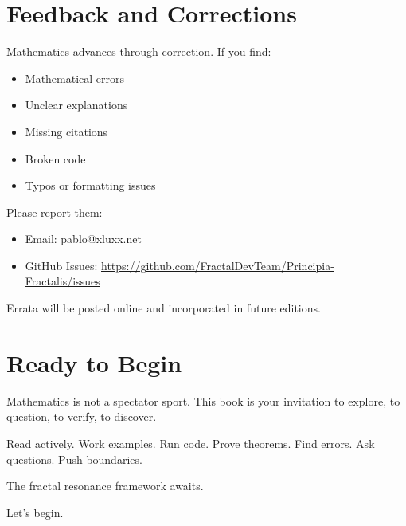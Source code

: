 \section*{Feedback and Corrections}

Mathematics advances through correction. If you find:
\begin{itemize}
\item Mathematical errors
\item Unclear explanations
\item Missing citations
\item Broken code
\item Typos or formatting issues
\end{itemize}

Please report them:
\begin{itemize}
\item Email: pablo@xluxx.net
\item GitHub Issues: \url{https://github.com/FractalDevTeam/Principia-Fractalis/issues}
\end{itemize}

Errata will be posted online and incorporated in future editions.

\section*{Ready to Begin}

Mathematics is not a spectator sport. This book is your invitation to explore, to question, to verify, to discover.

Read actively. Work examples. Run code. Prove theorems. Find errors. Ask questions. Push boundaries.

The fractal resonance framework awaits.

Let's begin.
